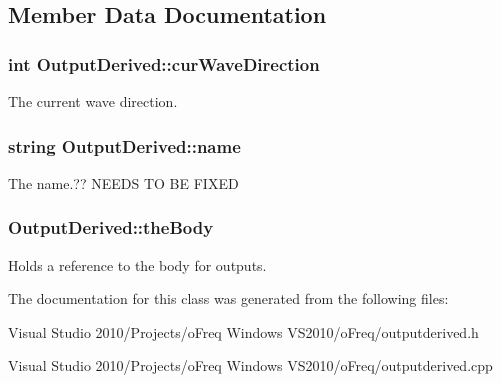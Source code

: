 \subsection{Member Data Documentation}
\hypertarget{class_output_derived_af0bf64d22f81f60368cd01a448596fe9}{
\subsubsection[{cur\-Wave\-Direction}]{\setlength{\rightskip}{0pt plus 5cm}int Output\-Derived\-::cur\-Wave\-Direction}}\label{class_output_derived_af0bf64d22f81f60368cd01a448596fe9}
The current wave direction. \hypertarget{class_output_derived_ae2ee713862294ab274c78a604ee962b4}{
\subsubsection[{name}]{\setlength{\rightskip}{0pt plus 5cm}string Output\-Derived\-::name}}\label{class_output_derived_ae2ee713862294ab274c78a604ee962b4}
The name.?? N\-E\-E\-D\-S T\-O B\-E F\-I\-X\-E\-D \hypertarget{class_output_derived_aa326f34bcce8fa06e67016bb57069e16}{
\subsubsection[{the\-Body}]{ Output\-Derived\-::the\-Body}}\label{class_output_derived_aa326f34bcce8fa06e67016bb57069e16}
Holds a reference to the body for outputs. 

The documentation for this class was generated from the following files\-:\begin{DoxyCompactItemize}
\item 
Visual Studio 2010/\-Projects/o\-Freq Windows V\-S2010/o\-Freq/outputderived.\-h\item 
Visual Studio 2010/\-Projects/o\-Freq Windows V\-S2010/o\-Freq/outputderived.\-cpp\end{DoxyCompactItemize}
